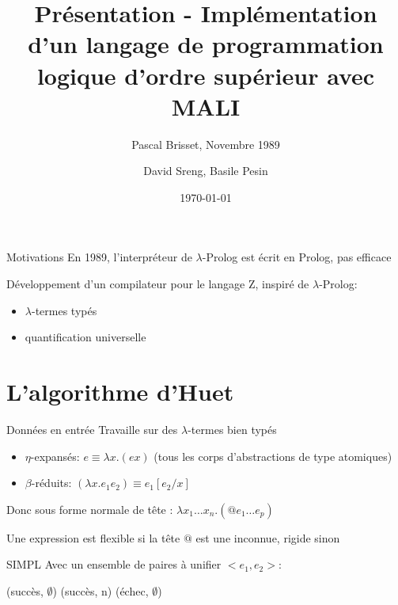 \documentclass[aspectratio=169]{beamer}
\title{Présentation - Implémentation d’un langage de programmation logique d’ordre supérieur avec MALI}
\subtitle{Pascal Brisset, Novembre 1989}
\date{\today}
\author{David Sreng, Basile Pesin}
\institute{Faculté des Sciences de Sorbonne Université}
\begin{document}

\lstset{basicstyle=\tt\footnotesize, frame=single}

\maketitle

\begin{frame}{Motivations}
  En 1989, l'interpréteur de $\lambda$-Prolog est écrit en Prolog, pas efficace

  Développement d'un compilateur pour le langage Z, inspiré de $\lambda$-Prolog:
  \begin{itemize}
    \item $\lambda$-termes typés
    \item quantification universelle
  \end{itemize}
\end{frame}

\section{L'algorithme d'Huet}

\begin{frame}{Données en entrée}
  Travaille sur des $\lambda$-termes bien typés
  \begin{itemize}
    \item $\eta$-expansés: $e \equiv \lambda x.(e x)$ (tous les corps d'abstractions de type atomiques)
    \item $\beta$-réduits: $(\lambda x . e_1 e_2) \equiv e_1[e_2/x]$
  \end{itemize}
  Donc sous forme normale de tête : $\lambda x_1 \ldots x_n . (@ e_1 \ldots e_p)$

  Une expression est flexible si la tête $@$ est une inconnue, rigide sinon
\end{frame}

\begin{frame}{SIMPL}
  Avec un ensemble de paires à unifier $<e_1, e_2>$:
  \begin{algorithmic}
     (succès, $\emptyset$)
    \EndIf
     (succès, n)
    \EndIf
     (échec, $\emptyset$)
    \Else
    \EndIf
    \EndIf
    \EndProcedure
  \end{algorithmic}
\end{frame}
\end{document}
